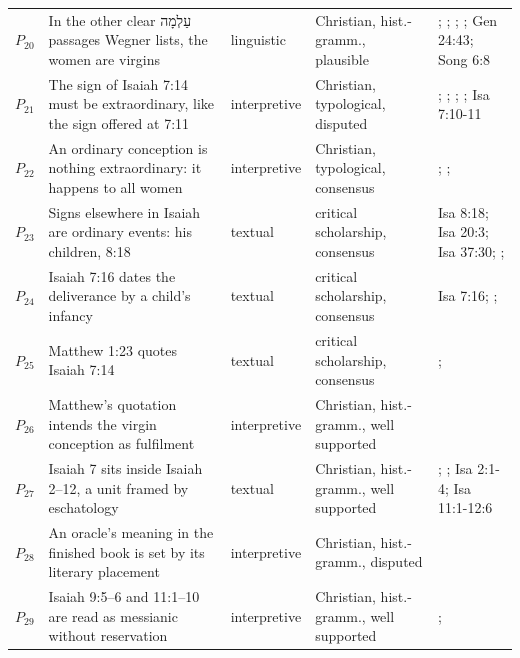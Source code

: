 \documentclass[11pt]{article}
\begin{document}
\begin{longtable}{@{}r >{\raggedright\arraybackslash}p{} l >{\raggedright\arraybackslash}p{} >{\raggedright\arraybackslash}p{}@{}}
$P_{20}$ & In the other clear עַלְמָה passages Wegner lists, the women are virgins & linguistic & Christian, hist.-gramm., plausible & \cite[468]{postell-isaiah-messianic-2025}; \cite[471--472]{wegner-virgin-births-2011}; \cite[I.32]{jerome-against-jovinianus-393}; \cite[8]{compton-immanuel-prophecy-2007}; Gen 24:43; Song 6:8 \\
$P_{21}$ & The sign of Isaiah 7:14 must be extraordinary, like the sign offered at 7:11 & interpretive & Christian, typological, disputed & \cite[I.35]{origen-against-celsus-248}; \cite[84]{justin-dialogue-with-trypho-160}; \cite[III.21.6]{irenaeus-against-heresies-180}; \cite[474]{postell-isaiah-messianic-2025}; Isa 7:10-11 \\
$P_{22}$ & An ordinary conception is nothing extraordinary: it happens to all women & interpretive & Christian, typological, consensus & \cite[III.21.6]{irenaeus-against-heresies-180}; \cite[84]{justin-dialogue-with-trypho-160}; \cite[64]{rhodea-did-matthew-conceive-2013} \\
$P_{23}$ & Signs elsewhere in Isaiah are ordinary events: his children, 8:18 & textual & critical scholarship, consensus & Isa 8:18; Isa 20:3; Isa 37:30; \cite[64]{rhodea-did-matthew-conceive-2013}; \cite[470]{wegner-virgin-births-2011} \\
$P_{24}$ & Isaiah 7:16 dates the deliverance by a child's infancy & textual & critical scholarship, consensus & Isa 7:16; \cite[477]{wegner-virgin-births-2011}; \cite[14]{compton-immanuel-prophecy-2007} \\
$P_{25}$ & Matthew 1:23 quotes Isaiah 7:14 & textual & critical scholarship, consensus & \cite[app. Matt 1:23]{na28-2012}; \cite{ubs5-2014} \\
$P_{26}$ & Matthew's quotation intends the virgin conception as fulfilment & interpretive & Christian, hist.-gramm., well supported & \cite[ad loc. Matt 1:23]{france-matthew-2007} \\
$P_{27}$ & Isaiah 7 sits inside Isaiah 2–12, a unit framed by eschatology & textual & Christian, hist.-gramm., well supported & \cite[483--490]{postell-isaiah-messianic-2025}; \cite[122--123]{motyer-context-content-1970}; Isa 2:1-4; Isa 11:1-12:6 \\
$P_{28}$ & An oracle's meaning in the finished book is set by its literary placement & interpretive & Christian, hist.-gramm., disputed & \cite[483--486]{postell-isaiah-messianic-2025} \\
$P_{29}$ & Isaiah 9:5–6 and 11:1–10 are read as messianic without reservation & interpretive & Christian, hist.-gramm., well supported & \cite[487--489]{postell-isaiah-messianic-2025}; \cite{chilton-isaiah-targum-1987} \\

\end{longtable}
\end{document}
